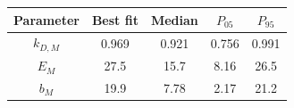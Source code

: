 \begin{tabular}{ccccc}
\toprule
Parameter & Best fit & Median & $P_{05}$ & $P_{95}$\\
\midrule
$k_{D,M}$ & 0.969 & 0.921 & 0.756 & 0.991\\
$E_{M}$ & 27.5 & 15.7 & 8.16 & 26.5\\
$b_M$ & 19.9 & 7.78 & 2.17 & 21.2\\
\bottomrule
\end{tabular}
